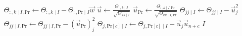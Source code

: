 \begin{algorithmic}[1]
    \)
    \STATE \(
        \Theta_{:, k \mid I, \text{Pr}} \gets
        \Theta_{:, k \mid I} -
        \Theta_{:, \text{Pr} \mid I} \vec{w}
    \)
    \STATE \(
      \vec{u} \gets
      \frac{\Theta_{:, k \mid I}}{\sqrt{\Theta_{kk \mid I}}}
    \)
    \STATE \(
      \vec{u}_\text{Pr} \gets
      \frac{\Theta_{:, k \mid I, \text{Pr}}}
            {\sqrt{\Theta_{kk \mid I, \text{Pr}}}}
    \)
      \STATE \(
        \Theta_{jj \mid I} \gets
        \Theta_{jj \mid I} -
        \vec{u}_j^2
      \)
      \STATE \(
        \Theta_{jj \mid I, \text{Pr}} \gets
        \Theta_{jj \mid I, \text{Pr}} -
        (\vec{u}_\text{Pr})_j^2
      \)
        \STATE \(
          \Theta_{j, \text{Pr}[c] \mid I} \gets
          \Theta_{j, \text{Pr}[c] \mid I} -
          \vec{u}_j \vec{u}_{n + c}
        \)
      \ENDFOR
    \ENDFOR
  \ENDWHILE
  \RETURN \( I \)
\end{algorithmic}

